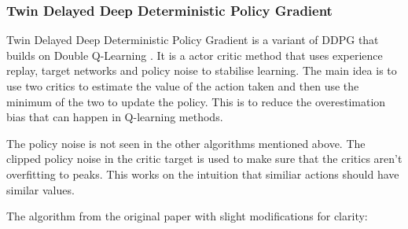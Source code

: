 \subsubsection{Twin Delayed Deep Deterministic Policy Gradient}\label{subsec:TD3}

Twin Delayed Deep Deterministic Policy Gradient \cite{fujimotoAddressingFunctionApproximation2018} is a variant of DDPG \cite{lillicrapContinuousControlDeep2016} that builds on Double Q-Learning \cite{hasseltDeepReinforcementLearning2015}. It is a actor critic method that uses experience replay, target networks and policy noise to stabilise learning. The main idea is to use two critics to estimate the value of the action taken and then use the minimum of the two to update the policy. This is to reduce the overestimation bias that can happen in Q-learning methods.

The policy noise is not seen in the other algorithms mentioned above. The clipped policy noise in the critic target is used to make sure that the critics aren't overfitting to peaks. This works on the intuition that similiar actions should have similar values.

The algorithm from the original paper \cite{fujimotoAddressingFunctionApproximation2018} with slight modifications for clarity:

